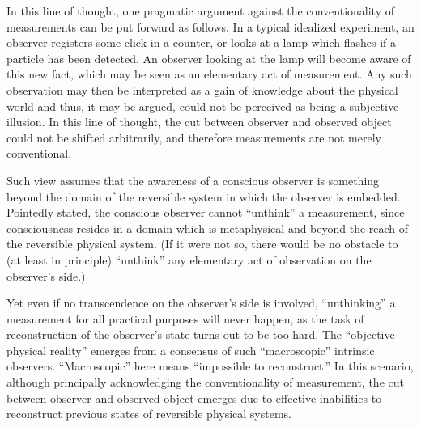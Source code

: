 In this line of thought,
one pragmatic argument against the conventionality of measurements can be
put forward as follows.
In a typical idealized experiment, an observer registers
some click in a counter, or looks at a lamp which flashes if a particle has been
detected.
An observer looking at the lamp will become aware of this new fact,
which may be seen as
an elementary act of measurement.
Any such observation may then be interpreted
as a gain of knowledge about the physical world
and thus, it may be argued, could not be perceived as being a subjective illusion.
In this line of thought, the cut between observer and observed object could not
be shifted arbitrarily, and therefore measurements are not merely conventional.

Such view assumes that the awareness of a conscious observer is
something beyond the domain of the reversible system in which the observer is embedded.
Pointedly stated, the conscious observer cannot ``unthink'' a measurement,
since  consciousness resides in a domain which is metaphysical and beyond the reach of
the reversible physical system.
(If it were not so, there would be no obstacle to (at least in principle)
``unthink'' any elementary act of observation on the observer's side.)

Yet even if no transcendence on the observer's side is involved,
``unthinking'' a measurement for all practical purposes will never happen, as the task of
reconstruction of the observer's state turns out to be too hard.
The ``objective physical reality'' emerges from a consensus of such ``macroscopic''
intrinsic observers.
``Macroscopic'' here means ``impossible to reconstruct.''
In this scenario, although principally acknowledging the conventionality of measurement,
the cut between observer and observed object emerges due to effective inabilities to
reconstruct previous states of reversible physical systems.


